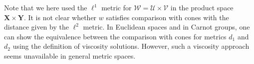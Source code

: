 \documentclass[12pt, reqno]{amsart}
\newcommand{\R}{\mathbb{R}}
\def\R{{\mathbb R}}
\def\X{{\mathbf X}}
\def\Y{{\mathbf Y}}
\def\O{{\mathcal O}}
\def\U{{\mathcal U}}
\def\V{{\mathcal V}}
\def\W{{\mathcal W}}
\begin{document}
Note that we here used the $\ell^1$ metric for $\W= \U\times \V$ in the product space $\X\times \Y$. %
It is not clear whether $w$ satisfies comparison with cones with the distance given by the $\ell^2$ metric. %
In Euclidean spaces and in Carnot groups, one can show the equivalence between the comparison with cones for metrics $d_1$ and $d_2$ using the definition of viscosity solutions. However, such a viscosity approach seems unavailable in general metric spaces.

\end{document}
